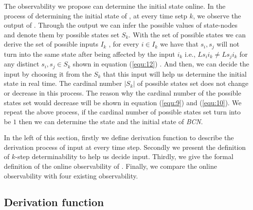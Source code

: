 The observability we propose can determine the initial state online.
 In the process of determining the initial state of \BCNs, at every time setp $k$, we observe the output of \BCNs. Through the output we can infer the possible values of state-nodes and denote them by possible states set $S_k$. %
With the set of possible states we can derive the set of possible inputs $I_k$ , for every $i\in I_k$ we have that $s_i, s_j$ will not turn into the same state after being affected by the input $i_k$ i.e., $Ls_i i_k\neq Ls_j i_k$ for any distinct $s_i, s_j\in S_k$ shown in equation (\ref{equ:12}) . And then, we can decide the input by choosing it from the $S_k$ that this input will help us determine the initial state in real time. The cardinal number $|S_k|$ of possible states set does not change or decrease in this process. The reason why the cardinal number of the possible states set would decrease will be shown in equation (\ref{equ:9}) and (\ref{equ:10}). We repeat the above process, if the cardinal number of possible states set turn into be $1$ then we can determine the state and the initial state of {\em BCN}. 

 In the left of this section, firstly we define derivation function to describe the derivation process of input at every time step. Secondly we present the definition of $k$-step determinability to help us decide input. Thirdly, we give the formal definition of the online observability of \BCNs. Finally, we compare the online observability with four existing observability.
\subsection{Derivation function}

